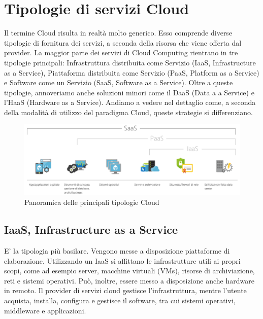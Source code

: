 \section{Tipologie di servizi Cloud}
Il termine Cloud risulta in realtà molto generico. Esso comprende diverse tipologie di fornitura dei servizi, a seconda della risorsa che viene offerta dal provider. La maggior parte dei servizi di Cloud Computing rientrano in tre tipologie principali: Infrastruttura distribuita come Servizio (IaaS, Infrastructure as a Service), Piattaforma distribuita come Servizio (PaaS, Platform as a Service) e Software come un Servizio (SaaS, Software as a Service). Oltre a queste tipologie, annoveriamo anche soluzioni minori come il DaaS (Data a a Service) e l'HaaS (Hardware as a Service). Andiamo a vedere nel dettaglio come, a seconda della modalità di utilizzo del paradigma Cloud, queste strategie si differenziano. 
\begin{figure}
	\centering
	\includegraphics[width=0.7\linewidth]{capitoli/imgs/TipologieCloud}
	\caption{Panoramica delle principali tipologie Cloud}
	\label{fig:tipologiecloud}
\end{figure}

\subsection{IaaS, Infrastructure as a Service}
E' la tipologia più basilare. Vengono messe a disposizione piattaforme di elaborazione. Utilizzando un IaaS si affittano le infrastrutture utili ai propri scopi, come ad esempio server, macchine virtuali (VMs), risorse di archiviazione, reti e sistemi operativi. Può, inoltre, essere messo a disposizione anche hardware in remoto. Il provider di servizi cloud gestisce l'infrastruttura, mentre l'utente acquista, installa, configura e gestisce il software, tra cui sistemi operativi, middleware e applicazioni.
